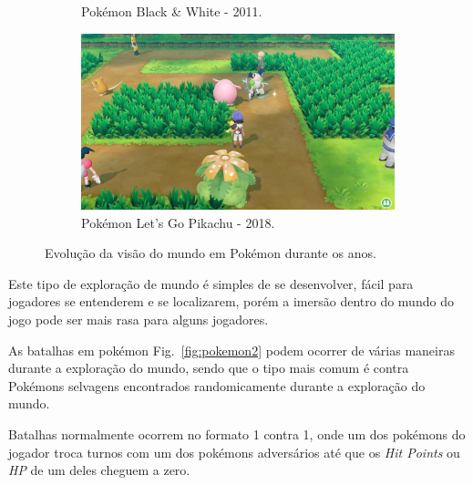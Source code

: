 \begin{figure}[h!]
\begin{subfigure}[b]{0.49\linewidth}
    \caption{Pokémon Black \& White - 2011.}
  \end{subfigure}
  \begin{subfigure}[b]{0.49\linewidth}
    \includegraphics[width=\linewidth]{lgpikachu.jpg}
    \caption{Pokémon Let’s Go Pikachu - 2018.}
  \end{subfigure}
  \caption{Evolução da visão do mundo em Pokémon durante os anos.}
  \label{fig:pokemon}
\end{figure}

Este tipo de exploração de mundo é simples de se desenvolver, fácil para jogadores se entenderem e se localizarem, porém a imersão dentro do mundo do jogo pode ser mais rasa para alguns jogadores.

	As batalhas em pokémon Fig.~\ref{fig:pokemon2} podem ocorrer de várias maneiras durante a exploração do mundo, sendo que o tipo mais comum é contra Pokémons selvagens encontrados randomicamente durante a exploração do mundo.

	Batalhas normalmente ocorrem no formato 1 contra 1, onde um dos pokémons do jogador troca turnos com um dos pokémons adversários até que os \emph{Hit Points} ou \emph{HP} de um deles cheguem a zero.

